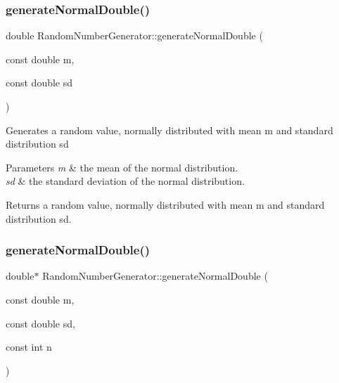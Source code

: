 \subsubsection{\texorpdfstring{generate\+Normal\+Double()}{generateNormalDouble()}\hspace{0.1cm}{\footnotesize\ttfamily [1/2]}}
{\footnotesize\ttfamily double Random\+Number\+Generator\+::generate\+Normal\+Double (\begin{DoxyParamCaption}\item[{const double}]{m,  }\item[{const double}]{sd }\end{DoxyParamCaption})}

Generates a random value, normally distributed with mean m and standard distribution sd 
\begin{DoxyParams}{Parameters}
{\em m} & the mean of the normal distribution. \\
\hline
{\em sd} & the standard deviation of the normal distribution. \\
\hline
\end{DoxyParams}
\begin{DoxyReturn}{Returns}
a random value, normally distributed with mean m and standard distribution sd. 
\end{DoxyReturn}
\mbox{\label{class_random_number_generator_a8a08591104b4fd1943eade351aa126c9}} 
\subsubsection{\texorpdfstring{generate\+Normal\+Double()}{generateNormalDouble()}\hspace{0.1cm}{\footnotesize\ttfamily [2/2]}}
{\footnotesize\ttfamily double$\ast$ Random\+Number\+Generator\+::generate\+Normal\+Double (\begin{DoxyParamCaption}\item[{const double}]{m,  }\item[{const double}]{sd,  }\item[{const int}]{n }\end{DoxyParamCaption})}

